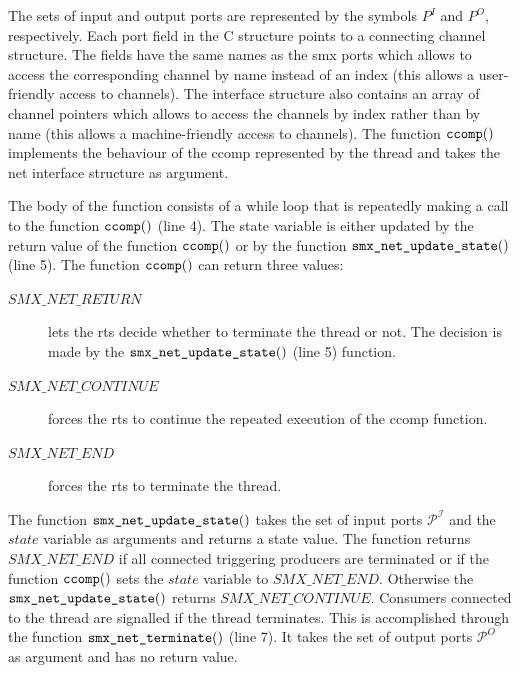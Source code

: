 The sets of input and output ports are represented by the symbols $P^I$ and $P^O$, respectively.
Each port field in the C structure points to a connecting channel structure.
The fields have the same names as the \gls*{smx} ports which allows to access the corresponding channel by name instead of an index (this allows a user-friendly access to channels).
The interface structure also contains an array of channel pointers which allows to access the channels by index rather than by name (this allows a machine-friendly access to channels).
The function $\textnormal{\tt ccomp}()$ implements the behaviour of the \gls*{ccomp} represented by the thread and takes the net interface structure as argument.

The body of the function consists of a while loop that is repeatedly making a call to the function $\textnormal{\tt ccomp}()$ (line 4).
The state variable is either updated by the return value of the function $\textnormal{\tt ccomp}()$ or by the function $\textnormal{\tt smx\_net\_update\_state}()$ (line 5).
The function $\textnormal{\tt ccomp}()$ can return three values:
\begin{description}
    \item[$\mathit{SMX\_NET\_RETURN}$] lets the \gls{rts} decide whether to terminate the thread or not.
        The decision is made by the $\textnormal{\tt smx\_net\_update\_state}()$ (line 5) function.
    \item[$\mathit{SMX\_NET\_CONTINUE}$] forces the \gls{rts} to continue the repeated execution of the \gls*{ccomp} function.
    \item[$\mathit{SMX\_NET\_END}$] forces the \gls{rts} to terminate the thread.
\end{description}
The function $\textnormal{\tt smx\_net\_update\_state}()$ takes the set of input ports $\mathcal{P^I}$ and the $state$ variable as arguments and returns a state value.
The function returns $\mathit{SMX\_NET\_END}$ if all connected triggering producers are terminated or if the function $\textnormal{\tt ccomp}()$ sets the $state$ variable to $\mathit{SMX\_NET\_END}$.
Otherwise the $\textnormal{\tt smx\_net\_update\_state}()$ returns $\mathit{SMX\_NET\_CONTINUE}$.
Consumers connected to the thread are signalled if the thread terminates.
This is accomplished through the function $\textnormal{\tt smx\_net\_terminate}()$ (line 7).
It takes the set of output ports $\mathcal{P}^O$ as argument and has no return value.

